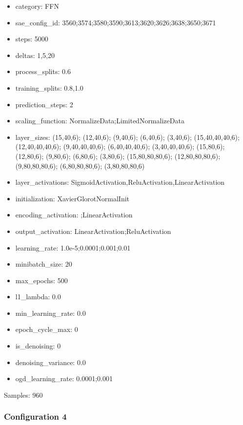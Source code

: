 \documentclass[a4paper,11pt,oneside]{article}
\theoremstyle{plain}
\theoremstyle{definition}
\begin{document}
	\begin{itemize}
		\item category: FFN
		\item sae\_config\_id: 3560;3574;3580;3590;3613;3620;3626;3638;3650;3671
		\item steps: 5000
		\item deltas: 1,5,20
		\item process\_splits: 0.6
		\item training\_splits: 0.8,1.0
		\item prediction\_steps: 2
		\item scaling\_function: NormalizeData;LimitedNormalizeData
		\item layer\_sizes: (15,40,6); (12,40,6); (9,40,6); (6,40,6); (3,40,6); (15,40,40,40,6); (12,40,40,40,6); (9,40,40,40,6); (6,40,40,40,6); (3,40,40,40,6); (15,80,6);(12,80,6); (9,80,6); (6,80,6); (3,80,6); (15,80,80,80,6); (12,80,80,80,6); (9,80,80,80,6); (6,80,80,80,6); (3,80,80,80,6)
		\item layer\_activations: SigmoidActivation,ReluActivation,LinearActivation
		\item initialization: XavierGlorotNormalInit
		\item encoding\_activation: ;LinearActivation
		\item output\_activation: LinearActivation;ReluActivation
		\item learning\_rate: 1.0e-5;0.0001;0.001;0.01
		\item minibatch\_size: 20
		\item max\_epochs: 500
		\item l1\_lambda: 0.0
		\item min\_learning\_rate: 0.0
		\item epoch\_cycle\_max: 0
		\item is\_denoising: 0
		\item denoising\_variance: 0.0
		\item ogd\_learning\_rate: 0.0001;0.001
	\end{itemize}
	
	Samples: 960
	
	
	\subsubsection{Configuration 4}\label{config4}
	
\end{document}
